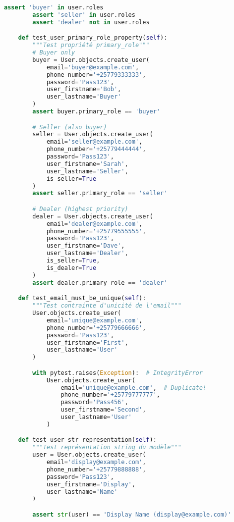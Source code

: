 \begin{lstlisting}[language=Python, caption=users/tests/test\_models.py]
        assert 'buyer' in user.roles
        assert 'seller' in user.roles
        assert 'dealer' not in user.roles

    def test_user_primary_role_property(self):
        """Test propriété primary_role"""
        # Buyer only
        buyer = User.objects.create_user(
            email='buyer@example.com',
            phone_number='+25779333333',
            password='Pass123',
            user_firstname='Bob',
            user_lastname='Buyer'
        )
        assert buyer.primary_role == 'buyer'

        # Seller (also buyer)
        seller = User.objects.create_user(
            email='seller@example.com',
            phone_number='+25779444444',
            password='Pass123',
            user_firstname='Sarah',
            user_lastname='Seller',
            is_seller=True
        )
        assert seller.primary_role == 'seller'

        # Dealer (highest priority)
        dealer = User.objects.create_user(
            email='dealer@example.com',
            phone_number='+25779555555',
            password='Pass123',
            user_firstname='Dave',
            user_lastname='Dealer',
            is_seller=True,
            is_dealer=True
        )
        assert dealer.primary_role == 'dealer'

    def test_email_must_be_unique(self):
        """Test contrainte d'unicité de l'email"""
        User.objects.create_user(
            email='unique@example.com',
            phone_number='+25779666666',
            password='Pass123',
            user_firstname='First',
            user_lastname='User'
        )

        with pytest.raises(Exception):  # IntegrityError
            User.objects.create_user(
                email='unique@example.com',  # Duplicate!
                phone_number='+25779777777',
                password='Pass456',
                user_firstname='Second',
                user_lastname='User'
            )

    def test_user_str_representation(self):
        """Test représentation string du modèle"""
        user = User.objects.create_user(
            email='display@example.com',
            phone_number='+25779888888',
            password='Pass123',
            user_firstname='Display',
            user_lastname='Name'
        )

        assert str(user) == 'Display Name (display@example.com)'
\end{lstlisting}

